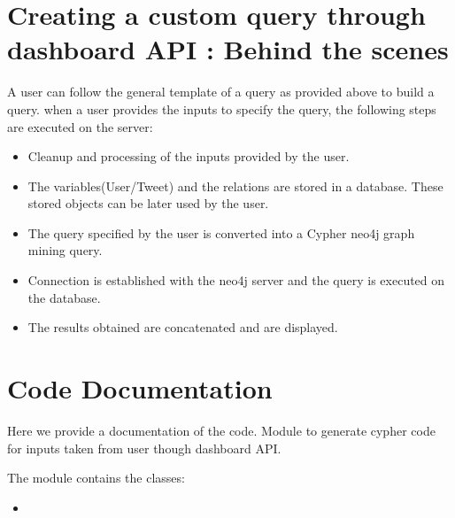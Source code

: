 \documentclass[letterpaper,10pt,english]{sphinxmanual}
\begin{document}
\section{Creating a custom query through dashboard API : Behind the scenes}
\label{\detokenize{neo4j_query_generation:creating-a-custom-query-through-dashboard-api-behind-the-scenes}}
A user can follow the general template of a query as provided above to build a query.
when a user provides the inputs to specify the query, the following steps are executed on the server:
\begin{itemize}
\item {} 
Cleanup and processing of the inputs provided by the user.

\item {} 
The variables(User/Tweet) and the relations are stored in a database. These stored objects can be later used by the user.

\item {} 
The query specified by the user is converted into a Cypher neo4j graph mining query.

\item {} 
Connection is established with the neo4j server and the query is executed on the database.

\item {} 
The results obtained are concatenated and are displayed.

\end{itemize}


\section{Code Documentation}
\label{\detokenize{neo4j_query_generation:code-documentation}}
Here we provide a documentation of the code.
\label{\detokenize{neo4j_query_generation:module-generate_queries}}
Module to generate cypher code for inputs taken from user though dashboard API.

The {\hyperref[\detokenize{neo4j_query_generation:module-generate_queries}]{}} module contains the classes:
\begin{itemize}
\item {} 
{\hyperref[\detokenize{neo4j_query_generation:generate_queries.CreateQuery}]{}}

\end{itemize}
\end{document}

